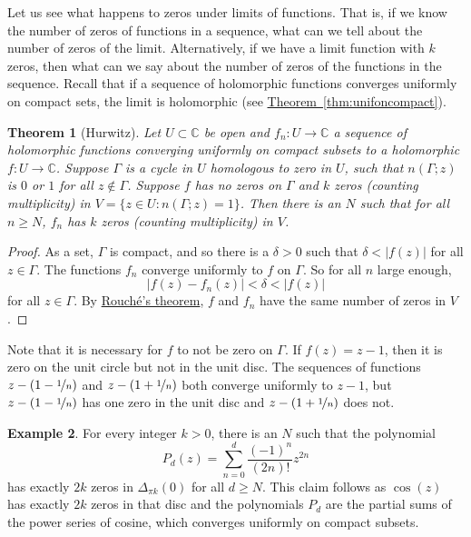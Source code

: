 \documentclass[12pt,openany]{book}
\newcommand{\sabs}[1]{\lvert {#1} \rvert}
\newcommand{\C}{{\mathbb{C}}}
\theoremstyle{plain}
\newtheorem{thm}{Theorem}[section]
\theoremstyle{remark}
\theoremstyle{definition}
\theoremstyle{exercise}
\theoremstyle{example}
\newtheorem{example}[thm]{Example}
\newcommand{\thmref}[1]{\hyperref[#1]{Theorem~\ref*{#1}}}
\begin{document}
Let us see what happens to zeros under limits of functions.
That is, if we know the number of zeros of functions in a sequence,
what can we tell about the number of zeros of the limit.  Alternatively,
if we have a limit function with $k$ zeros, then what can
we say about the number of zeros of the functions in the sequence.
Recall that if a sequence of holomorphic
functions converges uniformly on compact sets, the limit is holomorphic
(see \thmref{thm:unifoncompact}).

\begin{thm}[Hurwitz]
Let $U \subset \C$ be open and $f_n \colon U \to \C$ a sequence of
holomorphic functions converging uniformly on compact subsets
to a holomorphic $f \colon U \to \C$.  Suppose $\Gamma$ is
a cycle in $U$ homologous to zero in $U$,
such that $n(\Gamma;z)$ is $0$ or $1$ for all $z \notin \Gamma$.
Suppose $f$ has no zeros on $\Gamma$ and $k$ zeros (counting
multiplicity) in $V = \bigl\{ z \in U : n(\Gamma;z) = 1 \bigr\}$.
Then there is an $N$ such that for all $n \geq N$,
$f_n$ has $k$ zeros (counting multiplicity) in $V$.
\end{thm}

\begin{proof}
As a set, $\Gamma$ is compact, and so
there is a $\delta > 0$ such that $\delta < \sabs{f(z)}$
for all $z \in \Gamma$.
The functions $f_n$
converge uniformly to $f$ on $\Gamma$.
So for all $n$ large enough,
\begin{equation*}
\sabs{f(z)-f_n(z)} < \delta < \sabs{f(z)}
\end{equation*}
for all $z \in \Gamma$.  By \hyperref[thm:rouche2]{Rouch\'e's theorem},
$f$ and $f_n$ have the same number of zeros in $V$.
\end{proof}

Note that it is necessary for $f$
to not be zero on $\Gamma$.  If $f(z) = z-1$, then it is zero on
the unit circle but not in the unit disc.
The sequences of functions $z-(1-\nicefrac{1}{n})$ and 
$z-(1+\nicefrac{1}{n})$ both converge uniformly to $z-1$, but
$z-(1-\nicefrac{1}{n})$ has one zero in the unit disc
and $z-(1+\nicefrac{1}{n})$ does not.

\begin{example}
For every integer $k > 0$, there is an $N$ such that
the polynomial
\begin{equation*}
P_d(z) = \sum_{n=0}^d \frac{{(-1)}^n}{(2n)!}z^{2n}
\end{equation*}
has exactly $2k$ zeros in $\Delta_{\pi k}(0)$ for all $d \geq N$.
This claim follows as $\cos(z)$ has exactly $2k$ zeros in that disc
and the polynomials $P_d$ are the partial sums of the power series of
cosine, which converges uniformly on compact subsets.
\end{example}
  
\end{document}
